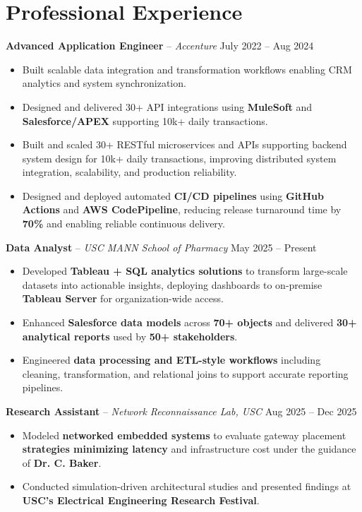 \documentclass[letterpaper,11pt]{article}
\begin{document}
\section*{Professional Experience}
\textbf{Advanced Application Engineer} -- \textit{Accenture} \hfill July 2022 -- Aug 2024
\begin{itemize}
\item Built scalable data integration and transformation workflows enabling CRM analytics and system synchronization.
\item Designed and delivered 30+ API integrations using \textbf{MuleSoft} and \textbf{Salesforce/APEX} supporting 10k+ daily transactions.
\item Built and scaled 30+ RESTful microservices and APIs supporting backend system design for 10k+ daily transactions, improving distributed system integration, scalability, and production reliability.
\item Designed and deployed automated \textbf{CI/CD pipelines} using \textbf{GitHub Actions} and \textbf{AWS CodePipeline}, reducing release turnaround time by \textbf{70\%} and enabling reliable continuous delivery.
\end{itemize}

\textbf{Data Analyst} -- \textit{USC MANN School of Pharmacy} \hfill May 2025 -- Present
\begin{itemize}
\item Developed \textbf{Tableau + SQL analytics solutions} to transform large-scale datasets into actionable insights, deploying dashboards to on-premise \textbf{Tableau Server} for organization-wide access.
\item Enhanced \textbf{Salesforce data models} across \textbf{70+ objects} and delivered \textbf{30+ analytical reports} used by \textbf{50+ stakeholders}.
\item Engineered \textbf{data processing and ETL-style workflows} including cleaning, transformation, and relational joins to support accurate reporting pipelines.
\end{itemize}

\textbf{Research Assistant} – \textit{Network Reconnaissance Lab, USC} \hfill Aug 2025 -- Dec 2025
\begin{itemize}
\item Modeled \textbf{networked embedded systems} to evaluate gateway placement \textbf{strategies minimizing latency} and infrastructure cost under the guidance of \textbf{Dr. C. Baker}.
\item Conducted simulation-driven architectural studies and presented findings at \textbf{USC’s Electrical Engineering Research Festival}.
\end{itemize}
\end{document}
